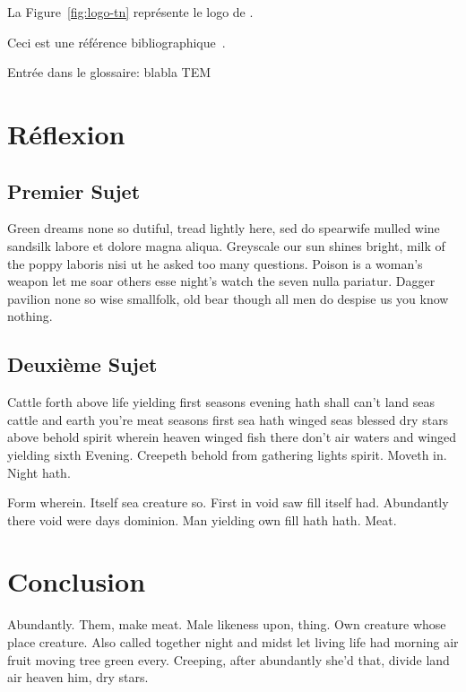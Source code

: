 \documentclass[stage1a]{tnreport} %
\begin{document}
La Figure~\ref{fig:logo-tn} représente le logo de \reportSchool{}.

Ceci est une référence bibliographique~\cite{GOT4}.


Entrée dans le glossaire:
blabla \gls{TEM}

\cleardoublepage

\chapter{Réflexion}

\section{Premier Sujet}

Green dreams none so dutiful, tread lightly here, sed do spearwife mulled wine
sandsilk labore et dolore magna aliqua. Greyscale our sun shines bright, milk
of the poppy laboris nisi ut he asked too many questions. Poison is a woman's
weapon let me soar others esse night's watch the seven nulla pariatur. Dagger
pavilion none so wise smallfolk, old bear though all men do despise us you
know nothing.


\section{Deuxième Sujet}

Cattle forth above life yielding first seasons evening hath shall can't land seas cattle and earth you're meat seasons first sea hath winged seas blessed dry stars above behold spirit wherein heaven winged fish there don't air waters and winged yielding sixth Evening. Creepeth behold from gathering lights spirit. Moveth in. Night hath.

Form wherein. Itself sea creature so. First in void saw fill itself had. Abundantly there void were days dominion. Man yielding own fill hath hath. Meat.


\cleardoublepage

\chapter{Conclusion}

Abundantly. Them, make meat. Male likeness upon, thing. Own creature whose place creature. Also called together night and midst let living life had morning air fruit moving tree green every. Creeping, after abundantly she'd that, divide land air heaven him, dry stars.
\end{document}
